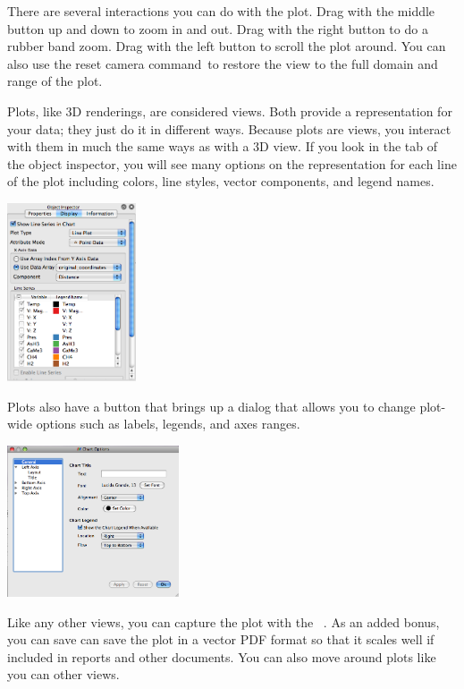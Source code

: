 There are several interactions you can do with the plot.  Drag with the
middle button up and down to zoom in and out.  Drag with the right button
to do a rubber band zoom.  Drag with the left button to scroll the plot
around.  You can also use the reset camera command~\resetCamera to restore
the view to the full domain and range of the plot.

Plots, like 3D renderings, are considered views.  Both provide a
representation for your data; they just do it in different ways.  Because
plots are views, you interact with them in much the same ways as with a 3D
view.  If you look in the  tab of the object inspector, you
will see many options on the representation for each line of the plot
including colors, line styles, vector components, and legend names.
\begin{inlinefig}
  \includegraphics[width=1.5in]{images/PlotDisplayTab}
\end{inlinefig}
Plots also have a  button that brings up a dialog that
allows you to change plot-wide options such as labels, legends, and axes
ranges.
\begin{inlinefig}
  \includegraphics[width=2in]{images/PlotViewOptions}
\end{inlinefig}
Like any other views, you can capture the plot with the  \ra
{}~.  As an added bonus, you
can save can save the plot in a vector PDF format so that it scales well if
included in reports and other documents.  You can also move around plots
like you can other views.

